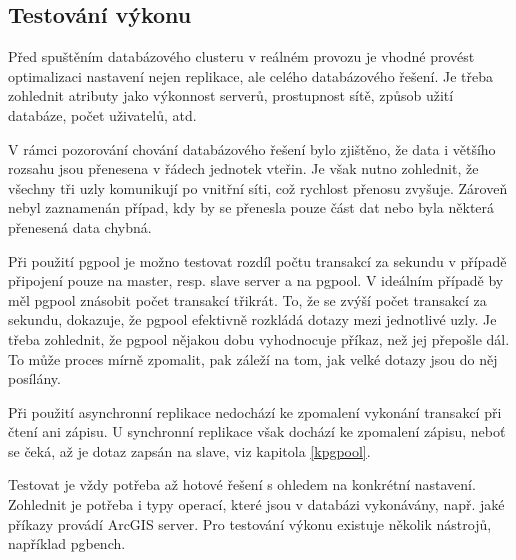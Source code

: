 \subsection{Testování výkonu}
Před spuštěním databázového clusteru v reálném provozu je vhodné provést
optimalizaci nastavení nejen replikace, ale celého databázového řešení. Je třeba
zohlednit atributy jako výkonnost serverů, prostupnost sítě, způsob užití
databáze, počet uživatelů, atd.

V rámci pozorování chování databázového řešení bylo zjištěno, že data i většího
rozsahu jsou přenesena v řádech jednotek vteřin. Je však nutno zohlednit, že
všechny tři uzly komunikují po vnitřní síti, což rychlost přenosu zvyšuje.
Zároveň nebyl zaznamenán případ, kdy by se přenesla pouze část dat nebo byla
některá přenesená data chybná.

Při použití pgpool je možno testovat rozdíl počtu transakcí za sekundu v případě
připojení pouze na master, resp. slave server a na pgpool. V ideálním případě by
měl pgpool znásobit počet transakcí třikrát. To, že se zvýší počet transakcí za
sekundu, dokazuje, že pgpool efektivně rozkládá dotazy mezi jednotlivé uzly. Je
třeba zohlednit, že pgpool nějakou dobu vyhodnocuje příkaz, než jej přepošle
dál. To může proces mírně zpomalit, pak záleží na tom, jak velké dotazy jsou do
něj posílány.

Při použití asynchronní replikace nedochází ke zpomalení vykonání transakcí při
čtení ani zápisu. U synchronní replikace však dochází ke zpomalení zápisu, neboť
se čeká, až je dotaz zapsán na slave, viz kapitola \ref{kpgpool}.

Testovat je vždy potřeba až hotové řešení s ohledem na konkrétní nastavení.
Zohlednit je potřeba i typy operací, které jsou v databázi vykonávány, např.
jaké příkazy provádí ArcGIS server.  Pro testování výkonu existuje několik
nástrojů, například pgbench.
